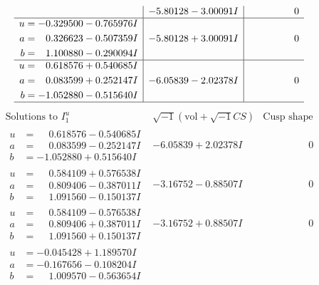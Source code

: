 \documentclass[1p]{elsarticle_modified}
\theoremstyle{definition}
\newcommand{\I}{\sqrt{-1}}
\begin{document}
$$\begin{array}{c|c|c}
 & -5.80128 - 3.00091 I & \phantom{-0.000000 } 0 \\ \hline\begin{aligned}
u &= -0.329500 - 0.765976 I \\
a &= \phantom{-}0.326623 - 0.507359 I \\
b &= \phantom{-}1.100880 - 0.290094 I\end{aligned}
 & -5.80128 + 3.00091 I & \phantom{-0.000000 } 0 \\ \hline\begin{aligned}
u &= \phantom{-}0.618576 + 0.540685 I \\
a &= \phantom{-}0.083599 + 0.252147 I \\
b &= -1.052880 - 0.515640 I\end{aligned}
 & -6.05839 - 2.02378 I & \phantom{-0.000000 } 0\\
 \hline 
 \end{array}$$\newpage$$\begin{array}{c|c|c}  
\text{Solutions to }I^u_{1}& \I (\text{vol} + \sqrt{-1}CS) & \text{Cusp shape}\\
 \hline 
\begin{aligned}
u &= \phantom{-}0.618576 - 0.540685 I \\
a &= \phantom{-}0.083599 - 0.252147 I \\
b &= -1.052880 + 0.515640 I\end{aligned}
 & -6.05839 + 2.02378 I & \phantom{-0.000000 } 0 \\ \hline\begin{aligned}
u &= \phantom{-}0.584109 + 0.576538 I \\
a &= \phantom{-}0.809406 - 0.387011 I \\
b &= \phantom{-}1.091560 - 0.150137 I\end{aligned}
 & -3.16752 - 0.88507 I & \phantom{-0.000000 } 0 \\ \hline\begin{aligned}
u &= \phantom{-}0.584109 - 0.576538 I \\
a &= \phantom{-}0.809406 + 0.387011 I \\
b &= \phantom{-}1.091560 + 0.150137 I\end{aligned}
 & -3.16752 + 0.88507 I & \phantom{-0.000000 } 0 \\ \hline\begin{aligned}
u &= -0.045428 + 1.189570 I \\
a &= -0.167656 - 0.108204 I \\
b &= \phantom{-}1.009570 - 0.563654 I\end{aligned}

\end{array}$$
\end{document}
